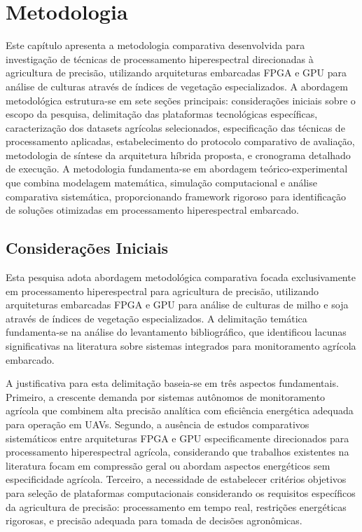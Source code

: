 \chapter{Metodologia}\label{chp:metodologia}

Este capítulo apresenta a metodologia comparativa desenvolvida para investigação 
de técnicas de processamento hiperespectral direcionadas à agricultura de 
precisão, utilizando arquiteturas embarcadas FPGA e GPU para análise de culturas 
através de índices de vegetação especializados. A abordagem metodológica 
estrutura-se em sete seções principais: considerações iniciais sobre o escopo 
da pesquisa, delimitação das plataformas tecnológicas específicas, caracterização 
dos datasets agrícolas selecionados, especificação das técnicas de processamento 
aplicadas, estabelecimento do protocolo comparativo de avaliação, metodologia 
de síntese da arquitetura híbrida proposta, e cronograma detalhado de execução. 
A metodologia fundamenta-se em abordagem teórico-experimental que combina 
modelagem matemática, simulação computacional e análise comparativa sistemática, 
proporcionando framework rigoroso para identificação de soluções otimizadas 
em processamento hiperespectral embarcado.

\section{Considerações Iniciais}\label{sec:consideracoes_iniciais}

Esta pesquisa adota abordagem metodológica comparativa focada exclusivamente em 
processamento hiperespectral para agricultura de precisão, utilizando arquiteturas 
embarcadas FPGA e GPU para análise de culturas de milho e soja através de índices 
de vegetação especializados. A delimitação temática 
fundamenta-se na análise do levantamento bibliográfico, que identificou lacunas significativas na literatura 
sobre sistemas integrados para monitoramento agrícola embarcado. 

A justificativa para esta delimitação baseia-se em três aspectos fundamentais. 
Primeiro, a crescente demanda por sistemas autônomos de monitoramento agrícola 
que combinem alta precisão analítica com eficiência energética adequada para 
operação em UAVs. Segundo, a ausência de estudos comparativos sistemáticos entre 
arquiteturas FPGA e GPU especificamente direcionados para processamento 
hiperespectral agrícola, considerando que trabalhos existentes na literatura 
focam em compressão geral ou abordam aspectos energéticos sem especificidade agrícola. Terceiro, a necessidade 
de estabelecer critérios objetivos para seleção de plataformas computacionais 
considerando os requisitos específicos da agricultura de precisão: processamento 
em tempo real, restrições energéticas rigorosas, e precisão adequada para tomada 
de decisões agronômicas.

